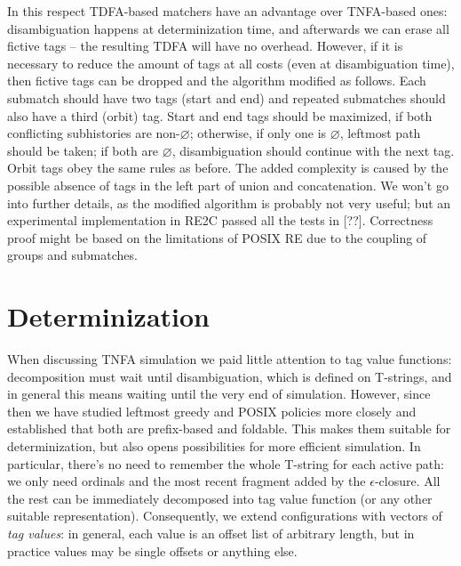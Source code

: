 \documentclass{article}
\theoremstyle{definition}
\begin{document}
\begin{multicols}{2}
In this respect TDFA-based matchers have an advantage over TNFA-based ones:
disambiguation happens at determinization time,
and afterwards we can erase all fictive tags -- the resulting TDFA will have no overhead.
However, if it is necessary to reduce the amount of tags at all costs (even at disambiguation time),
then fictive tags can be dropped and the algorithm modified as follows.
Each submatch should have two tags (start and end)
and repeated submatches should also have a third (orbit) tag.
Start and end tags should be maximized, if both conflicting subhistories are non-$\varnothing$;
otherwise, if only one is $\varnothing$, leftmost path should be taken;
if both are $\varnothing$, disambiguation should continue with the next tag.
Orbit tags obey the same rules as before.
The added complexity is caused by the possible absence of tags in the left part of union and concatenation.
We won't go into further details, as the modified algorithm is probably not very useful;
but an experimental implementation in RE2C passed all the tests in [??].
Correctness proof might be based on the limitations of POSIX RE due to the coupling of groups and submatches.

\section{Determinization}\label{section_determinization}

When discussing TNFA simulation we paid little attention to tag value functions:
decomposition must wait until disambiguation, which is defined on T-strings,
and in general this means waiting until the very end of simulation.
However, since then we have studied leftmost greedy and POSIX policies more closely
and established that both are prefix-based and foldable.
This makes them suitable for determinization, but also opens possibilities for more efficient simulation.
In particular, there's no need to remember the whole T-string for each active path:
we only need ordinals and the most recent fragment added by the $\epsilon$-closure.
All the rest can be immediately decomposed into tag value function (or any other suitable representation).
Consequently, we extend configurations with vectors of \emph{tag values}:
in general, each value is an offset list of arbitrary length,
but in practice values may be single offsets or anything else.
\\


\end{multicols}
\end{document}
